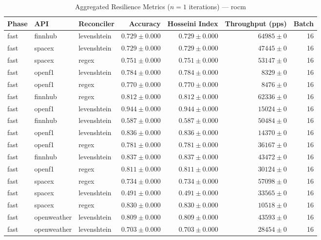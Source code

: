 
\begin{table}[htbp]
\caption{Aggregated Resilience Metrics ($n=1$ iterations) --- rocm}
\begin{tabular}{l l l r r r r}
\hline
Phase & API & Reconciler & Accuracy & Hosseini Index & Throughput (pps) & Batch \\
\hline
fast & finnhub & levenshtein & $0.729\pm0.000$ & $0.729\pm0.000$ & $64985\pm0$ & 16 \\
fast & spacex & levenshtein & $0.729\pm0.000$ & $0.729\pm0.000$ & $47445\pm0$ & 16 \\
fast & spacex & regex & $0.751\pm0.000$ & $0.751\pm0.000$ & $53147\pm0$ & 16 \\
fast & openf1 & levenshtein & $0.784\pm0.000$ & $0.784\pm0.000$ & $8329\pm0$ & 16 \\
fast & openf1 & regex & $0.770\pm0.000$ & $0.770\pm0.000$ & $8476\pm0$ & 16 \\
fast & finnhub & regex & $0.812\pm0.000$ & $0.812\pm0.000$ & $62336\pm0$ & 16 \\
fast & openf1 & levenshtein & $0.944\pm0.000$ & $0.944\pm0.000$ & $15024\pm0$ & 16 \\
fast & finnhub & levenshtein & $0.587\pm0.000$ & $0.587\pm0.000$ & $50484\pm0$ & 16 \\
fast & openf1 & levenshtein & $0.836\pm0.000$ & $0.836\pm0.000$ & $14370\pm0$ & 16 \\
fast & openf1 & regex & $0.781\pm0.000$ & $0.781\pm0.000$ & $36167\pm0$ & 16 \\
fast & finnhub & levenshtein & $0.837\pm0.000$ & $0.837\pm0.000$ & $43472\pm0$ & 16 \\
fast & openf1 & regex & $0.811\pm0.000$ & $0.811\pm0.000$ & $30124\pm0$ & 16 \\
fast & spacex & regex & $0.734\pm0.000$ & $0.734\pm0.000$ & $57098\pm0$ & 16 \\
fast & spacex & levenshtein & $0.491\pm0.000$ & $0.491\pm0.000$ & $33565\pm0$ & 16 \\
fast & spacex & regex & $0.830\pm0.000$ & $0.830\pm0.000$ & $10518\pm0$ & 16 \\
fast & openweather & levenshtein & $0.809\pm0.000$ & $0.809\pm0.000$ & $43593\pm0$ & 16 \\
fast & openweather & levenshtein & $0.703\pm0.000$ & $0.703\pm0.000$ & $28454\pm0$ & 16 \\

\end{tabular}
\end{table}

